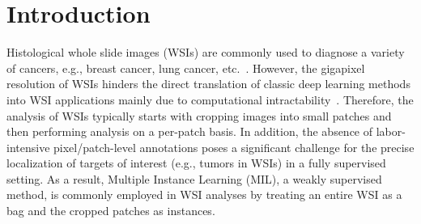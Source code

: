 \documentclass[runningheads]{llncs}
\begin{document}
\section{Introduction}
Histological whole slide images (WSIs) are commonly used to diagnose a variety of cancers, e.g., breast cancer, lung cancer, etc.~\cite{cancer}. However, the gigapixel resolution of WSIs hinders the direct translation of classic deep learning methods into WSI applications mainly due to computational intractability~\cite{wsi1,wsi2,wsi3,clam-sb}. Therefore, the analysis of WSIs typically starts with cropping images into small patches and then performing analysis on a per-patch basis. In addition, the absence of labor-intensive pixel/patch-level annotations poses a significant challenge for the precise localization of targets of interest (e.g., tumors in WSIs) in a fully supervised setting. As a result, Multiple Instance Learning (MIL), a weakly supervised method, is commonly employed in WSI analyses by treating an entire WSI as a bag and the cropped patches as instances. \\
\end{document}

